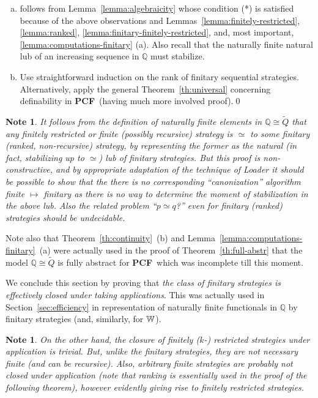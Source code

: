 \documentclass[fleqn]{LMCS}
\theoremstyle{plain}\newtheorem{satz}[thm]{Satz}
\theoremstyle{plain}\newtheorem{hyp}[thm]{Hypothesis}
\theoremstyle{plain}\newtheorem{hyps}[thm]{Hypotheses}
\theoremstyle{definition}\newtheorem{note}[thm]{Note}
\newcommand{\bbQ}{\mathbb{Q}}
\newcommand{\PCF}{\mbox{\bf PCF}}
\newcommand{\tQ}{\tilde{Q}}
\newcommand{\?}{\mbox{?}}
\begin{document}
\proof\hfill
\begin{enumerate}[(a)]
\item follows from Lemma~\ref{lemma:algebraicity} whose condition (*) 
is satisfied because of the above observations and  
Lemmas~\ref{lemma:finitely-restricted}, \ref{lemma:ranked}, 
\ref{lemma:finitary-finitely-restricted}, and, most important, 
\ref{lemma:computations-finitary} (a).
Also recall that the naturally finite natural lub of an increasing sequence 
in $\bbQ$ must stabilize. 

\item Use straightforward induction on the rank of finitary sequential strategies.  
Alternatively, apply the general Theorem~\ref{th:universal} concerning definability 
in \PCF\ (having much more involved proof).\qed
\end{enumerate}



\begin{note}\label{note:finite-simeq-finitary}\em
It follows from the definition of naturally finite elements in $\bbQ\cong\tQ$ 
that any finitely restricted or finite 
(possibly recursive) strategy is $\simeq$ 
to some finitary (ranked, non-recursive) strategy, by representing the former as  
the natural (in fact, stabilizing up to $\simeq$) lub of finitary strategies. 
But this proof is non-constructive, and by appropriate adaptation 
of the technique of Loader \cite{LoaderTCS2001} it should be possible to show that 
the \emph{there is no corresponding ``canonization'' algorithm} 
finite $\mapsto$ finitary as there is no way to determine the moment 
of stabilization in the above lub. Also the related \emph{problem ``$p\simeq q$?'' 
even for finitary (ranked) strategies should be undecidable}. 
\end{note}

\noindent
Note also that Theorem~\ref{th:continuity}~(b)  
and Lemma~\ref{lemma:computations-finitary}~(a) were 
actually used in the proof of Theorem~\ref{th:full-abstr} 
that the model $\bbQ\cong\tQ$ is fully abstract for \PCF\ 
which was incomplete till this moment. 



\medskip

We conclude this section by proving that \emph{the class of finitary strategies 
is effectively closed under taking applications}. This was actually used in  
Section~\ref{sec:efficiency} in representation of naturally finite functionals 
in $\bbQ$ by finitary strategies (and, similarly, for $\mathbb{W}$). 
\begin{note}\label{note:closure-under-appl-of-finite-strategies}\em
On the other hand, the closure of finitely ($k$-) restricted strategies under 
application is trivial. But, unlike the finitary strategies, they are not necessary finite 
(and can be recursive). Also, \emph{arbitrary finite strategies are 
probably not closed under application} 
(note that ranking is essentially used in the proof of the following theorem), 
however evidently giving rise to finitely restricted strategies. 
\end{note}
\end{document}
